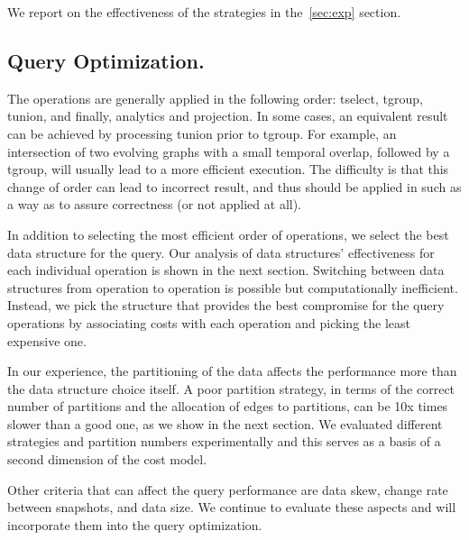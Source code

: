 We report on the effectiveness of the strategies in the~\ref{sec:exp}
section.

\subsection{Query Optimization.}

The operations are generally applied in the following order: tselect,
tgroup, tunion, and finally, analytics and projection.  In some cases,
an equivalent result can be achieved by processing tunion prior to
tgroup.  For example, an intersection of two evolving graphs with a
small temporal overlap, followed by a tgroup, will usually lead to a
more efficient execution.    The difficulty is that this change of order can lead
to incorrect result, and thus should be applied in such as a way as to
assure correctness (or not applied at all).

In addition to selecting the most efficient order of operations, we
select the best data structure for the query.  Our analysis of data
structures' effectiveness for each individual operation is shown in
the next section.  Switching between data structures from operation to
operation is possible but computationally inefficient.  Instead, we
pick the structure that provides the best compromise for the query
operations by associating costs with each operation and picking the
least expensive one.  

In our experience, the partitioning of the data affects the
performance more than the data structure choice itself.  A poor
partition strategy, in terms of the correct number of partitions and
the allocation of edges to partitions, can be 10x times slower than a
good one, as we show in the next section.  We evaluated different
strategies and partition numbers experimentally and this serves as a
basis of a second dimension of the cost model.

Other criteria that can affect the query performance are data skew,
change rate between snapshots, and data size.  We continue to evaluate
these aspects and will incorporate them into the query optimization.

